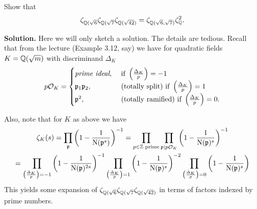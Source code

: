 \documentclass[a4paper,11pt]{article}
\begin{document}
Show that 
\begin{equation*}
    \zeta_{\mathbb{Q}(\sqrt 6} \zeta_{\mathbb{Q}(\sqrt 7} \zeta_{\mathbb{Q}(\sqrt {42})} 
    = \zeta_{\mathbb{Q}(\sqrt 6, \sqrt 7)} \zeta_{\mathbb{Q}}^2.
\end{equation*}

\textbf{Solution.} 
Here we will only sketch a solution. The details are tedious.
Recall that from the lecture (Example 3.12, say) we have for quadratic fields
$K = \mathbb{Q}(\sqrt m)$ with discriminand $\Delta_K$
\begin{equation*}
    p\mathcal{O}_K = 
    \begin{cases}
        \textit{prime ideal}, &\text{ if } \left( \frac{\Delta_K}{p} \right) = -1 \\
        \mathfrak{p}_1 \mathfrak{p}_2, &\text{ (totally split) if } \left( \frac{\Delta_K}{p} \right) = 1 \\
        \mathfrak{p}^2, &\text{ (totally ramified) if } \left( \frac{\Delta_K}{p} \right) = 0.
    \end{cases}
\end{equation*}

Also, note that for $K$ as above we have
\begin{multline*}
    \zeta_K(s) = \prod_{\mathfrak{p}} \left( 1 - \frac{1}{\operatorname{N}(\mathfrak{p}^s)} \right)^{-1}  = 
    \prod_{p \in \mathbb{Z} \text{ prime}} \prod_{\mathfrak{p} \mid p \mathcal{O}_K} \left(1-
    \frac1{\operatorname{N}(\mathfrak{p})^s}\right)^{-1} \\
    = \prod_{\left( \frac{\Delta_K}{p} \right) = -1}\left( 1 - \frac{1}{\operatorname{N}(\mathfrak{p})^{2s}}\right)^{-1}
        \prod_{\left( \frac{\Delta_K}{p} \right) = 1}\left( 1 - \frac{1}{\operatorname{N}(\mathfrak{p})^{s}}\right)^{-2}
        \prod_{\left( \frac{\Delta_K}{p} \right) = 0}\left( 1 - \frac{1}{\operatorname{N}(\mathfrak{p})^{s}}\right)
\end{multline*}
This yields some expansion of $\zeta_{\mathbb{Q}(\sqrt 6} \zeta_{\mathbb{Q}(\sqrt 7}
\zeta_{\mathbb{Q}(\sqrt {42})}$ in terms of factors indexed by prime numbers.
\end{document}

